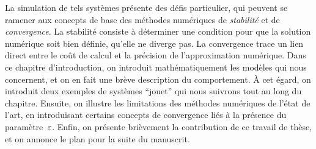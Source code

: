 La simulation de tels systèmes présente des défis particulier, qui peuvent se ramener aux concepts de base des méthodes numériques de \textit{stabilité} et de \textit{convergence}. La stabilité consiste à déterminer une condition pour que la solution numérique soit bien définie, qu'elle ne diverge pas. La convergence trace un lien direct entre le coût de calcul et la précision de l'approximation numérique. Dans ce chapitre d'introduction, on introduit mathématiquement les modèles qui nous concernent, et on en fait une brève description du comportement. À cet égard, on introduit deux exemples de systèmes \enquote{jouet} qui nous suivrons tout au long du chapitre. Ensuite, on illustre les limitations des méthodes numériques de l'état de l'art, en introduisant certains concepts de convergence liés à la présence du paramètre~$\varepsilon$. Enfin, on présente brièvement la contribution de ce travail de thèse, et on annonce le plan pour la suite du manuscrit. 








% 

% 






